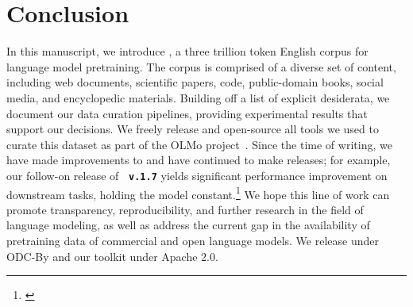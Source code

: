 

\section*{Conclusion}
\label{sec:conclusion}

In this manuscript, we introduce \dolma, a three trillion token English corpus for language model pretraining. 
The \dolma corpus is comprised of a diverse set of content, including web documents, scientific papers, code, public-domain books, social media, and encyclopedic materials.
Building off a list of explicit desiderata, we document our data curation pipelines, providing experimental results that support our decisions. 
We freely release \dolma and open-source all tools we used to curate this dataset as part of the OLMo project~\citep{olmo20247b}. 
Since the time of writing, we have made improvements to \dolma and have continued to make releases; for example, our follow-on release of \textbf{\dolma~\texttt{v.1.7}} yields significant performance improvement on downstream tasks, holding the model constant.\footnote{
\href{https://blog.allenai.org/olmo-1-7-7b-a-24-point-improvement-on-mmlu-92b43f7d269d}{}}
We hope this line of work can promote transparency, reproducibility, and further research in the field of language modeling, 
as well as address the current gap in the availability of pretraining data of commercial and open language models.
We release \dolma under ODC-By
and our toolkit under Apache 2.0.
